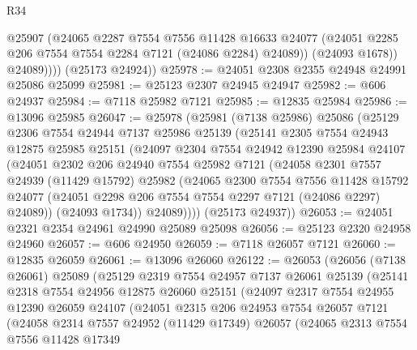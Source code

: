 \begin{lexlean}{R34}
\begin{coremodule}
                @25907
                (@24065
                  @2287
                  @7554
                  @7556
                  @11428
                  @16633
                  @24077
                  (@24051 @2285 @206 @7554 @7554 @2284 @7121 (@24086 @2284) @24089))
                (@24093 @1678))
              @24089))))
      (@25173 @24924))
@25978 := @24051 @2308 @2355 @24948 @24991 @25086 @25099
@25981 := @25123 @2307 @24945 @24947
@25982 := @606 @24937
@25984 := @7118 @25982 @7121
@25985 := @12835 @25984
@25986 := @13096 @25985
@26047 := @25978
    (@25981
      (@7138 @25986)
      @25086
      (@25129
        @2306
        @7554
        @24944
        @7137
        @25986
        @25139
        (@25141
          @2305
          @7554
          @24943
          @12875
          @25985
          @25151
          (@24097
            @2304
            @7554
            @24942
            @12390
            @25984
            @24107
            (@24051
              @2302
              @206
              @24940
              @7554
              @25982
              @7121
              (@24058
                @2301
                @7557
                @24939
                (@11429 @15792)
                @25982
                (@24065
                  @2300
                  @7554
                  @7556
                  @11428
                  @15792
                  @24077
                  (@24051 @2298 @206 @7554 @7554 @2297 @7121 (@24086 @2297) @24089))
                (@24093 @1734))
              @24089))))
      (@25173 @24937))
@26053 := @24051 @2321 @2354 @24961 @24990 @25089 @25098
@26056 := @25123 @2320 @24958 @24960
@26057 := @606 @24950
@26059 := @7118 @26057 @7121
@26060 := @12835 @26059
@26061 := @13096 @26060
@26122 := @26053
    (@26056
      (@7138 @26061)
      @25089
      (@25129
        @2319
        @7554
        @24957
        @7137
        @26061
        @25139
        (@25141
          @2318
          @7554
          @24956
          @12875
          @26060
          @25151
          (@24097
            @2317
            @7554
            @24955
            @12390
            @26059
            @24107
            (@24051
              @2315
              @206
              @24953
              @7554
              @26057
              @7121
              (@24058
                @2314
                @7557
                @24952
                (@11429 @17349)
                @26057
                (@24065
                  @2313
                  @7554
                  @7556
                  @11428
                  @17349

\end{coremodule}
\end{lexlean}
